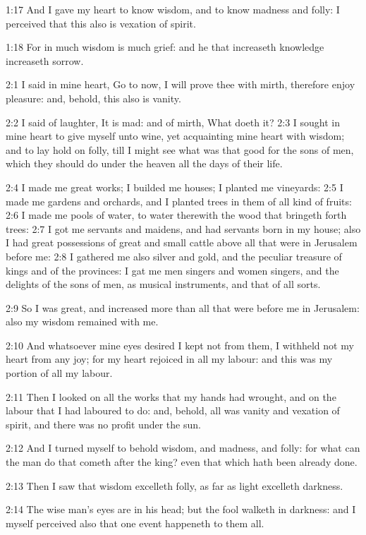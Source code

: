 1:17 And I gave my heart to know wisdom, and to know madness and
folly: I perceived that this also is vexation of spirit.

1:18 For in much wisdom is much grief: and he that increaseth
knowledge increaseth sorrow.

2:1 I said in mine heart, Go to now, I will prove thee with mirth,
therefore enjoy pleasure: and, behold, this also is vanity.

2:2 I said of laughter, It is mad: and of mirth, What doeth it?  2:3 I
sought in mine heart to give myself unto wine, yet acquainting mine
heart with wisdom; and to lay hold on folly, till I might see what was
that good for the sons of men, which they should do under the heaven
all the days of their life.

2:4 I made me great works; I builded me houses; I planted me
vineyards: 2:5 I made me gardens and orchards, and I planted trees in
them of all kind of fruits: 2:6 I made me pools of water, to water
therewith the wood that bringeth forth trees: 2:7 I got me servants
and maidens, and had servants born in my house; also I had great
possessions of great and small cattle above all that were in Jerusalem
before me: 2:8 I gathered me also silver and gold, and the peculiar
treasure of kings and of the provinces: I gat me men singers and women
singers, and the delights of the sons of men, as musical instruments,
and that of all sorts.

2:9 So I was great, and increased more than all that were before me in
Jerusalem: also my wisdom remained with me.

2:10 And whatsoever mine eyes desired I kept not from them, I withheld
not my heart from any joy; for my heart rejoiced in all my labour: and
this was my portion of all my labour.

2:11 Then I looked on all the works that my hands had wrought, and on
the labour that I had laboured to do: and, behold, all was vanity and
vexation of spirit, and there was no profit under the sun.

2:12 And I turned myself to behold wisdom, and madness, and folly: for
what can the man do that cometh after the king? even that which hath
been already done.

2:13 Then I saw that wisdom excelleth folly, as far as light excelleth
darkness.

2:14 The wise man's eyes are in his head; but the fool walketh in
darkness: and I myself perceived also that one event happeneth to them
all.

